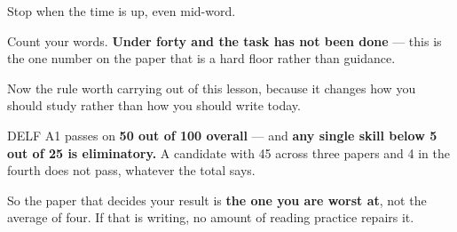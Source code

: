 Stop when the time is up, even mid-word.

\begin{tcolorbox}[breakable,colback=teal!4,colframe=teal!35!black,title={Before you move on}]
Count your words. \textbf{Under forty and the task has not been done} — this is the one number on the paper that is a hard floor rather than guidance.

Now the rule worth carrying out of this lesson, because it changes how you should study rather than how you should write today.

DELF A1 passes on \textbf{50 out of 100 overall} — and \textbf{any single skill below 5 out of 25 is eliminatory.} A candidate with 45 across three papers and 4 in the fourth does not pass, whatever the total says.

So the paper that decides your result is \textbf{the one you are worst at}, not the average of four. If that is writing, no amount of reading practice repairs it.
\end{tcolorbox}

